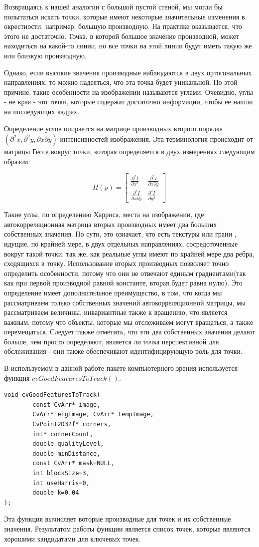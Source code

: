 Возвращаясь к нашей аналогии с большой пустой стеной, мы могли бы попытаться искать точки, которые имеют некоторые значительные изменения в окрестности, например, большую производную. На практике оказывается, что этого не достаточно. Точка, в которой большое значение производной, может находиться на какой-то линии, но все точки на этой линии будут иметь такую же или близкую производную.

Однако, если высокие значения производные наблюдаются в двух ортогональных направлениях, то можно надеяться, что эта точка будет уникальной. По этой причине, такие особенности на изображении называются углами. Очевидно, углы - не края - это точки, которые содержат достаточно информации, чтобы ее нашли на последующих кадрах.

Определение углов опирается на матрице производных второго порядка 
$(\partial^2 x, \partial^2 y, \partial x \partial y)$ интенсивностей изображения. Эта терминология происходит от матрицы Гессе вокруг точки, которая определяется в двух измерениях следующим образом:

$$ 
H(p) = 
\begin{bmatrix} 
	\frac{\partial^2 I}{\partial x^2} & \frac{\partial^2 I}{\partial x \partial y}  \\ 
 	 \frac{\partial^2 I}{\partial x \partial y} & \frac{\partial^2 I}{\partial y^2} 
\end{bmatrix}
$$

Такие углы, по определению Харриса, места на изображении, где автокорреляционная матрица вторых производных имеет два больших собственных значения. По сути, это означает, что есть текстуры или грани , идущие, по крайней мере, в двух отдельных направлениях, сосредоточенные вокруг такой точки, так же, как реальные углы имеют по крайней мере два ребра, сходящихся в точку. Использование вторых производных позволяет точно определить особенности, потому что они не отвечают единым градиентами(так как при первой производной равной константе, вторая будет равна нулю). Это определение имеет дополнительное преимущество, в том, что когда мы рассматриваем только собственных значений автокорреляционной матрицы, мы рассматриваем величины, инвариантные также к вращению, что является важным, потому что объекты, которые мы отслеживаем могут вращаться, а также перемещаться. Следует также отметить, что эти два собственных значения делают больше, чем просто определяют, является ли точка перспективной для обслеживания - они также обеспечивают идентифицирующую роль для точки.

В используемом в данной работе пакете компьютерного зрения используется функция  $cvGoodFeaturesToTrack()$.
\begin{verbatim}
void cvGoodFeaturesToTrack(
        const CvArr* image,
        CvArr* eigImage, CvArr* tempImage,
        CvPoint2D32f* corners,
        int* cornerCount,
        double qualityLevel,
        double minDistance,
        const CvArr* mask=NULL,
        int blockSize=3,
        int useHarris=0,
        double k=0.04 
);
\end{verbatim}
Эта функция вычисляет воторые производные для точек и их собственные значения. Результатом работы функции является список точек, которые являются хорошими кандидатами для ключевых точек.

